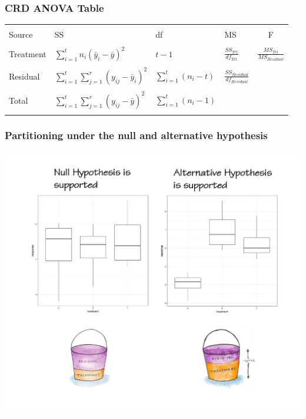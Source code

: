 \begin{frame}\frametitle{CRD ANOVA Table}
\begin{table}[ht]
\centering
\begin{tabular}{llllc}
\toprule
   & & & &\\
  Source & SS & df & MS & F \\
   & & & &\\
\midrule
   Treatment & $\sum\limits_{i=1}^{t}n_i(\bar{y}_{i}-\bar{y})^2$ & $t-1$ & $\frac{SS_{Trt}}{df_{Trt}}$ & $\frac{MS_{Trt}}{MS_{Residual}}$ \\
   & & & &\\
  Residual & $\sum\limits_{i=1}^{t} \sum\limits_{j=1}^{r} (y_{ij}-\bar{y}_{i})^2$ & $\sum\limits_{i=1}^{t}(n_i-t)$ & $\frac{SS_{Residual}}{df_{Residual}}$ &  \\
   & & & &\\
   Total & $\sum\limits_{i=1}^{t} \sum\limits_{j=1}^{r} (y_{ij}-\bar{y})^2 $ & $\sum\limits_{i=1}^{t}(n_i-1)$ &  &  \\
   & & & &\\
\bottomrule
\end{tabular}
\end{table}

\end{frame}


\begin{frame}\frametitle{Partitioning under the null and alternative hypothesis}
\centering
\includegraphics[height = 0.9\textheight]{compAcrd.png}
\end{frame}



